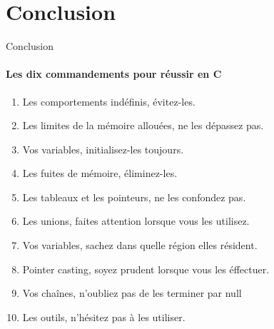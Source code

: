\section{Conclusion}
\begin{frame}{Conclusion}
	\framesubtitle{Les dix commandements pour réussir en C}
	\begin{enumerate}
		\item \alert{Les comportements indéfinis}, évitez-les.
		\item \alert{Les limites de la mémoire allouées}, ne les dépassez pas.
		\item \alert{Vos variables}, initialisez-les toujours.
		\item \alert{Les fuites de mémoire}, éliminez-les.
		\item \alert{Les tableaux et les pointeurs}, ne les confondez pas.
		\item \alert{Les unions}, faites attention lorsque vous les utilisez.
		\item \alert{Vos variables}, sachez dans quelle région elles résident.
		\item \alert{Pointer casting}, soyez prudent lorsque vous les éffectuer.
		\item \alert{Vos chaînes}, n'oubliez pas de les terminer par null
		\item \alert{Les outils}, n'hésitez pas à les utiliser.
	\end{enumerate}
\end{frame}